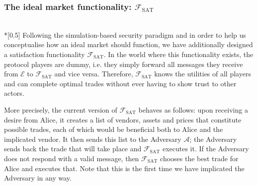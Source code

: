 \subsubsection{The ideal market functionality: $\mathcal{F}_{\mathrm{SAT}}$} \
\\*[0.5\baselineskip]
  Following the simulation-based security paradigm and in order to help us conceptualise
  how an ideal market should function, we have additionally designed a satisfaction
  functionality $\mathcal{F}_{\mathrm{SAT}}$. In the world where this functionality
  exists, the protocol players are dummy, i.e. they simply forward all messages they
  receive from $\mathcal{E}$ to $\mathcal{F}_{\mathrm{SAT}}$ and vice versa. Therefore,
  $\mathcal{F}_{\mathrm{SAT}}$ knows the utilities of all players and can complete optimal
  trades without ever having to show trust to other actors.

  More precisely, the current version of $\mathcal{F}_{\mathrm{SAT}}$ behaves as follows:
  upon receiving a desire from Alice, it creates a list of vendors, assets and prices that
  constitute possible trades, each of which would be beneficial both to Alice and the
  implicated vendor. It then sends this list to the Adversary $\mathcal{A}$; the Adversary
  sends back the trade that will take place and $\mathcal{F}_{\mathrm{SAT}}$ executes it.
  If the Adversary does not respond with a valid message, then
  $\mathcal{F}_{\mathrm{SAT}}$ chooses the best trade for Alice and executes that. Note
  that this is the first time we have implicated the Adversary in any way.

